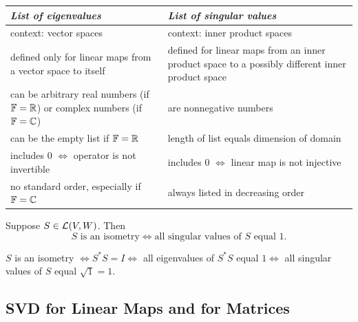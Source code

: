 \begin{center}
\begin{tabular}{|>{\RaggedRight}p{}|>{\RaggedRight}p{}|}
  \hline
  \emph{List of eigenvalues} & \emph{List of singular values} \\
  \hline
  context: vector spaces & context: inner product spaces \\
  \hline
  defined only for linear maps from a vector space to itself & defined for linear maps from an inner product space to a possibly different inner product space \\
  \hline
  can be arbitrary real numbers (if $\mathbb{F} = \mathbb{R}$) or complex numbers (if $\mathbb{F}=\mathbb{C}$) & are nonnegative numbers \\
  \hline
  can be the empty list if $\mathbb{F} = \mathbb{R}$ & length of list equals dimension of domain \\
  \hline
  includes $0$ $\iff$ operator is not invertible & includes $0$ $\iff$ linear map is not injective \\
  \hline
  no standard order, especially if $\mathbb{F} = \mathbb{C}$ & always listed in decreasing order \\
  \hline
\end{tabular}
\end{center}

\begin{thm}
  \label{thm: isometries characterized by having all singular values equal 1}
  Suppose $S \in \mathcal{L} (V,W)$. Then
  \begin{equation}
    S \text{ is an isometry} \iff \text{all singular values of } S \text{ equal } 1.
  \end{equation}
\end{thm}
\begin{prf}
  $S$ is an isometry $\iff S^*S = I \iff$ all eigenvalues of $S^*S$ equal $1 \iff$ all singular values of $S$ equal $\sqrt{1} = 1$.
\end{prf}

\subsection{SVD for Linear Maps and for Matrices}


